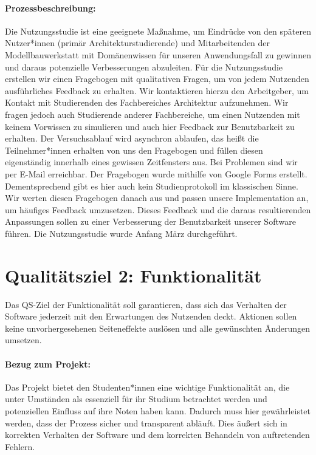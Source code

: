 \documentclass[
ngerman,
accentcolor=2d,
marginpar=false,
class=report,
fontsize=11pt,
ruledheaders=section,
]{tudapub}
\begin{document}
            \paragraph{Prozessbeschreibung:} Die Nutzungsstudie ist eine geeignete Maßnahme, um Eindrücke von den späteren Nutzer*innen (primär Architekturstudierende) und Mitarbeitenden der Modellbauwerkstatt mit Domänenwissen für unseren Anwendungsfall zu gewinnen und daraus potenzielle Verbesserungen abzuleiten. Für die Nutzungsstudie erstellen wir einen Fragebogen mit qualitativen Fragen, um von jedem Nutzenden ausführliches Feedback zu erhalten. Wir kontaktieren hierzu den Arbeitgeber, um Kontakt mit Studierenden des Fachbereiches Architektur aufzunehmen. Wir fragen jedoch auch Studierende anderer Fachbereiche, um einen Nutzenden mit keinem Vorwissen zu simulieren und auch hier Feedback zur Benutzbarkeit zu erhalten. Der Versuchsablauf wird asynchron ablaufen, das heißt die Teilnehmer*innen erhalten von uns den Fragebogen und füllen diesen eigenständig innerhalb eines gewissen Zeitfensters aus. Bei Problemen sind wir per E-Mail erreichbar. Der Fragebogen wurde mithilfe von Google Forms erstellt. Dementsprechend gibt es hier auch kein Studienprotokoll im klassischen Sinne. Wir werten diesen Fragebogen danach aus und passen unsere Implementation an, um häufiges Feedback umzusetzen.  Dieses Feedback und die daraus resultierenden Anpassungen sollen zu einer Verbesserung der Benutzbarkeit unserer Software führen. Die Nutzungsstudie wurde Anfang März durchgeführt.


		\section{Qualitätsziel 2: Funktionalität}

    		Das QS-Ziel der Funktionalität soll garantieren, dass sich das Verhalten der Software jederzeit mit den Erwartungen des Nutzenden deckt. Aktionen sollen keine unvorhergesehenen Seiteneffekte auslösen und alle gewünschten Änderungen umsetzen.

            \paragraph{Bezug zum Projekt:}
            Das Projekt bietet den Studenten*innen eine wichtige Funktionalität an, die unter Umständen als essenziell für ihr Studium betrachtet werden und potenziellen Einfluss auf ihre Noten haben kann. Dadurch muss hier gewährleistet werden, dass der Prozess sicher und transparent abläuft. Dies äußert sich in korrekten Verhalten der Software und dem korrekten Behandeln von auftretenden Fehlern.
\end{document}
